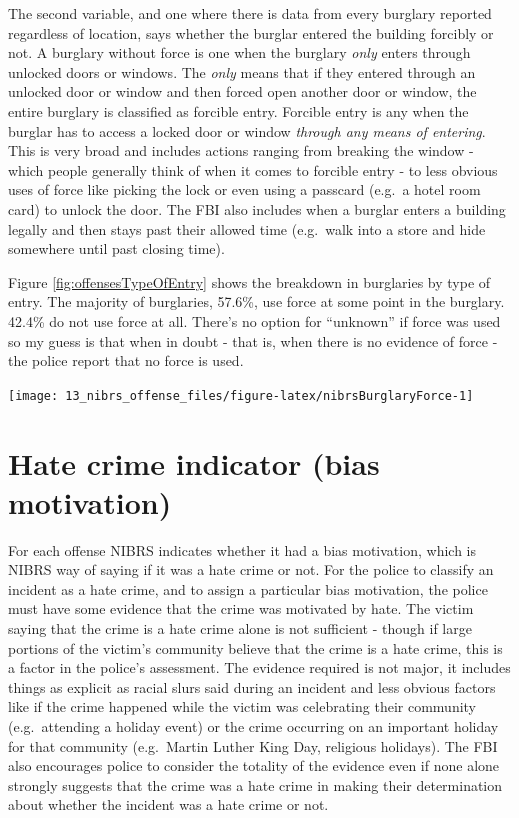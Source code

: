 \documentclass[
]{krantz}
\let\origfigure\figure
\let\endorigfigure\endfigure
\renewenvironment{figure}[1][2] {
    \expandafter\origfigure\expandafter[H]
} {
    \endorigfigure
}
\begin{document}
The second variable, and one where there is data from every
burglary reported regardless of location, says whether the
burglar entered the building forcibly or not. A burglary
without force is one when the burglary \emph{only} enters
through unlocked doors or windows. The \emph{only} means
that if they entered through an unlocked door or window and
then forced open another door or window, the entire burglary
is classified as forcible entry. Forcible entry is any when
the burglar has to access a locked door or window
\emph{through any means of entering}. This is very broad and
includes actions ranging from breaking the window - which
people generally think of when it comes to forcible entry -
to less obvious uses of force like picking the lock or even
using a passcard (e.g.~a hotel room card) to unlock the
door. The FBI also includes when a burglar enters a building
legally and then stays past their allowed time (e.g.~walk
into a store and hide somewhere until past closing time).

Figure \ref{fig:offensesTypeOfEntry} shows the breakdown in
burglaries by type of entry. The majority of burglaries,
57.6\%, use force at some point in the burglary. 42.4\% do
not use force at all. There's no option for ``unknown'' if
force was used so my guess is that when in doubt - that is,
when there is no evidence of force - the police report that
no force is used.

\begin{figure}

{\centering \texttt{[image: 13\_nibrs\_offense\_files/figure-latex/nibrsBurglaryForce-1]} 

}

\caption{The annual percent of burglaries, by whether entry used force, 1991-2022.}\label{fig:nibrsBurglaryForce}
\end{figure}

\section{Hate crime indicator (bias
motivation)}\label{hate-crime-indicator-bias-motivation}

For each offense NIBRS indicates whether it had a bias
motivation, which is NIBRS way of saying if it was a hate
crime or not. For the police to classify an incident as a
hate crime, and to assign a particular bias motivation, the
police must have some evidence that the crime was motivated
by hate. The victim saying that the crime is a hate crime
alone is not sufficient - though if large portions of the
victim's community believe that the crime is a hate crime,
this is a factor in the police's assessment. The evidence
required is not major, it includes things as explicit as
racial slurs said during an incident and less obvious
factors like if the crime happened while the victim was
celebrating their community (e.g.~attending a holiday event)
or the crime occurring on an important holiday for that
community (e.g.~Martin Luther King Day, religious holidays).
The FBI also encourages police to consider the totality of
the evidence even if none alone strongly suggests that the
crime was a hate crime in making their determination about
whether the incident was a hate crime or not.
\end{document}
